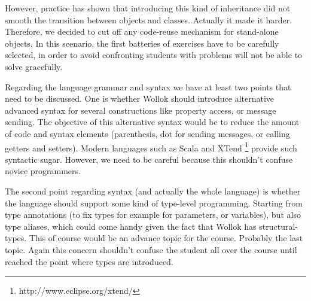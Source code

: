 However, practice has shown that introducing this kind of inheritance did not smooth the transition between objects and classes. Actually it made it harder.
Therefore, we decided to cut off any code-reuse mechanism for stand-alone objects.
In this scenario, the first batteries of exercises have to be carefully selected, 
in order to avoid confronting students with problems will not be able to solve gracefully.

\medskip
Regarding the language grammar and syntax we have at least two points that need to be discussed. 
One is whether Wollok should introduce alternative
advanced syntax for several constructions like property access, or message
sending. The objective of this alternative syntax would be to reduce the amount
of code and syntax elements (\eg parenthesis, dot for sending messages, or calling getters and
setters). Modern languages such as Scala\cite{Oder04a} and
XTend \footnote{http://www.eclipse.org/xtend/} provide such syntactic sugar.
However, we need to be careful because this shouldn't confuse novice programmers.

The second point regarding syntax (and actually the whole language) is whether
the language should support some kind of type-level programming. Starting from
type annotations (to fix types for example for parameters, or variables), but
also type aliases, which could come handy given the fact that Wollok has
structural-types. This of course would be an advance topic for the course.
Probably the last topic. Again this concern shouldn't confuse the student all
over the course until reached the point where types are introduced.


